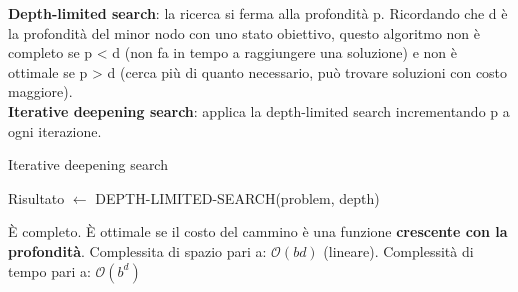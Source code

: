 \textbf{Depth-limited search}: la ricerca si ferma alla profondità p.
Ricordando che d è la profondità del minor nodo con uno stato obiettivo,
questo algoritmo non è completo se p < d (non fa in tempo a raggiungere una
soluzione) e non è ottimale se p > d (cerca più di quanto necessario, può
trovare soluzioni con costo maggiore).\\

\textbf{Iterative deepening search}: applica la depth-limited search incrementando
p a ogni iterazione.

\begin{algorithm}
    \caption{Iterative deepening search}
    \label{alg:search2}
    \begin{algorithmic}[1] %
         
            \State Risultato $\leftarrow$ DEPTH-LIMITED-SEARCH(problem, depth)
              \EndIf
			\EndFor
        \EndProcedure
    \end{algorithmic}
\end{algorithm}

È completo.
È ottimale se il costo del cammino è una funzione \textbf{crescente con
la profondità}.
Complessita di spazio pari a: $\mathcal{O}(bd)$ (lineare).
Complessità di tempo pari a: $\mathcal{O}(b^d)$\\

